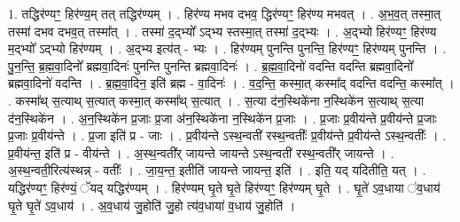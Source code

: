 \documentclass[17pt]{extarticle}
\begin{document}
1. तद्धिर॑ण्यꣳ॒॒ हिर॑ण्य॒म् तत् तद्धिर॑ण्यम् । . हिर॑ण्य मभव दभव॒ द्धिर॑ण्यꣳ॒॒ हिर॑ण्य मभवत् । . अ॒भ॒व॒त् तस्मा॒त् तस्मा॑ दभव दभव॒त् तस्मा᳚त् । . तस्मा॑ द॒द्भ्यो᳚ ऽद्भ्य स्तस्मा॒त् तस्मा॑ द॒द्भ्यः । . अ॒द्भ्यो हिर॑ण्यꣳ॒॒ हिर॑ण्य म॒द्भ्यो᳚ ऽद्भ्यो हिर॑ण्यम् । . अ॒द्भ्य इत्य॑त् - भ्यः । . हिर॑ण्यम् पुनन्ति पुनन्ति॒ हिर॑ण्यꣳ॒॒ हिर॑ण्यम् पुनन्ति । . पु॒न॒न्ति॒ ब्र॒ह्म॒वा॒दिनो᳚ ब्रह्मवा॒दिनः॑ पुनन्ति पुनन्ति ब्रह्मवा॒दिनः॑ । . ब्र॒ह्म॒वा॒दिनो॑ वदन्ति वदन्ति ब्रह्मवा॒दिनो᳚ ब्रह्मवा॒दिनो॑ वदन्ति । . ब्र॒ह्म॒वा॒दिन॒ इति॑ ब्रह्म - वा॒दिनः॑ । . व॒द॒न्ति॒ कस्मा॒त् कस्मा᳚द् वदन्ति वदन्ति॒ कस्मा᳚त् । . कस्मा᳚थ् स॒त्याथ् स॒त्यात् कस्मा॒त् कस्मा᳚थ् स॒त्यात् । . स॒त्या द॑न॒स्थिके॑ना न॒स्थिके॑न स॒त्याथ् स॒त्या द॑न॒स्थिके॑न । . अ॒न॒स्थिके॑न प्र॒जाः प्र॒जा अ॑न॒स्थिके॑ना न॒स्थिके॑न प्र॒जाः । . प्र॒जाः प्र॒वीय॑न्ते प्र॒वीय॑न्ते प्र॒जाः प्र॒जाः प्र॒वीय॑न्ते । . प्र॒जा इति॑ प्र - जाः । . प्र॒वीय॑न्ते ऽस्थ॒न्वती॑ रस्थ॒न्वतीः᳚ प्र॒वीय॑न्ते प्र॒वीय॑न्ते ऽस्थ॒न्वतीः᳚ । . प्र॒वीय॑न्त॒ इति॑ प्र - वीय॑न्ते । . अ॒स्थ॒न्वती᳚र् जायन्ते जायन्ते ऽस्थ॒न्वती॑ रस्थ॒न्वती᳚र् जायन्ते । . अ॒स्थ॒न्वती॒रित्य॑स्थन्न् - वतीः᳚ । . जा॒य॒न्त॒ इतीति॑ जायन्ते जायन्त॒ इति॑ । . इति॒ यद् यदितीति॒ यत् । . यद्धिर॑ण्यꣳ॒॒ हिर॑ण्यं॒ ॅयद् यद्धिर॑ण्यम् । . हिर॑ण्यम् घृ॒ते घृ॒ते हिर॑ण्यꣳ॒॒ हिर॑ण्यम् घृ॒ते । . घृ॒ते॑ ऽव॒धाया ॑व॒धाय॑ घृ॒ते घृ॒ते॑ ऽव॒धाय॑ । . अ॒व॒धाय॑ जु॒होति॑ जु॒हो त्य॑व॒धाया॑ व॒धाय॑ जु॒होति॑ । \newline
\end{document}
